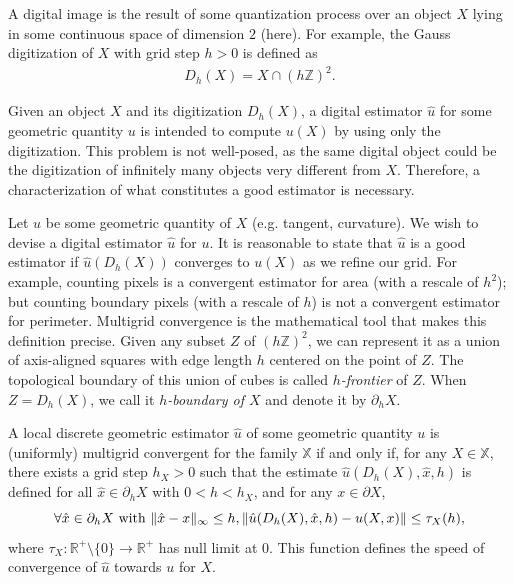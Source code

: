 \documentclass[runningheads]{llncs}
\DeclarePairedDelimiter\norm{\lVert}{\rVert}%
\begin{document}
\hrulefill

A digital image is the result of some quantization process over an object $X$ lying in some continuous space of
dimension $2$ (here).  For example, the Gauss digitization of $X$ with grid step $h>0$ is defined as
\begin{align*}
	D_h(X) = X \cap (h\mathbb{Z})^2.
\end{align*} 

Given an object $X$ and its digitization $D_h(X)$, a digital estimator $\hat{u}$ for some geometric quantity $u$ is
intended to compute $u(X)$ by using only the digitization. This problem is not well-posed, as the same digital object
could be the digitization of infinitely many objects very different from $X$. Therefore, a characterization of what constitutes
a good estimator is necessary.

Let $u$ be some geometric quantity of $X$ (e.g. tangent, curvature). We wish to devise a digital estimator $\hat{u}$ for
$u$. It is reasonable to state that $\hat{u}$ is a good estimator if $\hat{u}(D_h(X))$ converges to $u(X)$ as we refine
our grid. For example, counting pixels is a convergent estimator for area (with a rescale of $h^2$); but counting
boundary pixels (with a rescale of $h$) is not a convergent estimator for perimeter. Multigrid convergence is the
mathematical tool that makes this definition precise. Given any subset $Z$ of $(h\mathbb{Z})^2$, we can represent it as a
union of axis-aligned squares with edge length $h$ centered on the point of $Z$. The topological boundary of this union
of cubes is called {\em $h$-frontier} of $Z$. When $Z=D_h(X)$, we call it {\em $h$-boundary of $X$} and denote it by
$\partial_h X$.

\begin{definition}
  A local discrete geometric estimator $\hat{u}$ of some geometric
  quantity $u$ is (uniformly) multigrid convergent for the family $\mathbb{X}$ if
  and only if, for any $X \in \mathbb{X}$, there exists a grid step
  $h_X>0$ such that the estimate $\hat{u}(D_h(X),\hat{x},h)$ is
  defined for all $\hat{x} \in \partial_hX$ with $ 0 < h < h_X$, and
  for any $x \in \partial X$,
  \begin{equation*}
    \forall \hat{x} \in  \partial_hX \text{ with } \norm{ \hat{x} - x }_{\infty} \leq h, \norm{ \hat{u}(D_h(X),\hat{x},h) - u(X,x)} \leq \tau_{X}(h),			
  \end{equation*}
  where $\tau_{X}:\mathbb{R}^{+}\setminus\{0\} \rightarrow
  \mathbb{R}^{+}$ has null limit at $0$. This function defines the
  speed of convergence of $\hat{u}$ towards $u$ for $X$.
\end{definition}
	
\end{document}

